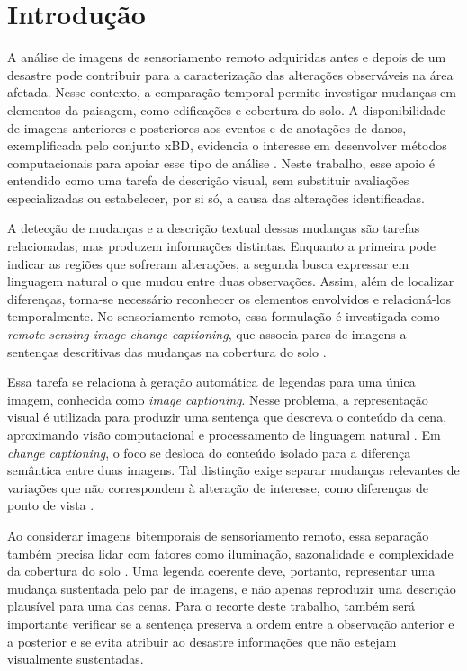 \section{Introdução}
\label{introducao}

A análise de imagens de sensoriamento remoto adquiridas antes e depois de um desastre pode contribuir para a caracterização das alterações observáveis na área afetada. Nesse contexto, a comparação temporal permite investigar mudanças em elementos da paisagem, como edificações e cobertura do solo. A disponibilidade de imagens anteriores e posteriores aos eventos e de anotações de danos, exemplificada pelo conjunto xBD, evidencia o interesse em desenvolver métodos computacionais para apoiar esse tipo de análise \citep{gupta2019xbd}. Neste trabalho, esse apoio é entendido como uma tarefa de descrição visual, sem substituir avaliações especializadas ou estabelecer, por si só, a causa das alterações identificadas.

A detecção de mudanças e a descrição textual dessas mudanças são tarefas relacionadas, mas produzem informações distintas. Enquanto a primeira pode indicar as regiões que sofreram alterações, a segunda busca expressar em linguagem natural o que mudou entre duas observações. Assim, além de localizar diferenças, torna-se necessário reconhecer os elementos envolvidos e relacioná-los temporalmente. No sensoriamento remoto, essa formulação é investigada como \textit{remote sensing image change captioning}, que associa pares de imagens a sentenças descritivas das mudanças na cobertura do solo \citep{liu2022}.

Essa tarefa se relaciona à geração automática de legendas para uma única imagem, conhecida como \textit{image captioning}. Nesse problema, a representação visual é utilizada para produzir uma sentença que descreva o conteúdo da cena, aproximando visão computacional e processamento de linguagem natural \citep{vinyals2015}. Em \textit{change captioning}, o foco se desloca do conteúdo isolado para a diferença semântica entre duas imagens. Tal distinção exige separar mudanças relevantes de variações que não correspondem à alteração de interesse, como diferenças de ponto de vista \citep{park2019}.

Ao considerar imagens bitemporais de sensoriamento remoto, essa separação também precisa lidar com fatores como iluminação, sazonalidade e complexidade da cobertura do solo \citep{chang2023}. Uma legenda coerente deve, portanto, representar uma mudança sustentada pelo par de imagens, e não apenas reproduzir uma descrição plausível para uma das cenas. Para o recorte deste trabalho, também será importante verificar se a sentença preserva a ordem entre a observação anterior e a posterior e se evita atribuir ao desastre informações que não estejam visualmente sustentadas.

